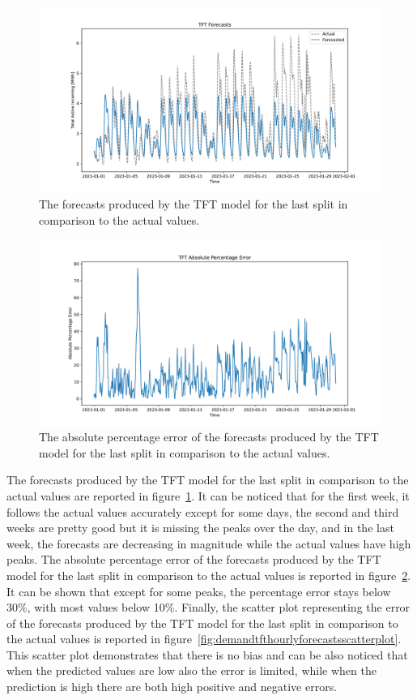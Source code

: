 \begin{figure}[H]
\centering
\includegraphics[width=1\textwidth]{images/demand/TFT}
\caption{The forecasts produced by the TFT model for the last split in comparison to the actual values.}
\label{fig:demandtfthourlyforecasts}
\end{figure}

\begin{figure}[H]
\centering
\includegraphics[width=1\textwidth]{images/demand/TFT_mape}
\caption{The absolute percentage error of the forecasts produced by the TFT model for the last split in comparison to the actual values.}
\label{fig:demandtfthourlyforecastsmape}
\end{figure}

The forecasts produced by the TFT model for the last split in comparison to the actual values are reported in figure~\ref{fig:demandtfthourlyforecasts}.
It can be noticed that for the first week, it follows the actual values accurately except for some days, the second and third weeks are pretty good but it is missing the peaks over the day, and in the last week, the forecasts are decreasing in magnitude while the actual values have high peaks.
The absolute percentage error of the forecasts produced by the TFT model for the last split in comparison to the actual values is reported in figure~\ref{fig:demandtfthourlyforecastsmape}.
It can be shown that except for some peaks, the percentage error stays below 30\%, with most values below 10\%.
Finally, the scatter plot representing the error of the forecasts produced by the TFT model for the last split in comparison to the actual values is reported in figure~\ref{fig:demandtfthourlyforecastsscatterplot}.
This scatter plot demonstrates that there is no bias and can be also noticed that when the predicted values are low also the error is limited, while when the prediction is high there are both high positive and negative errors.

